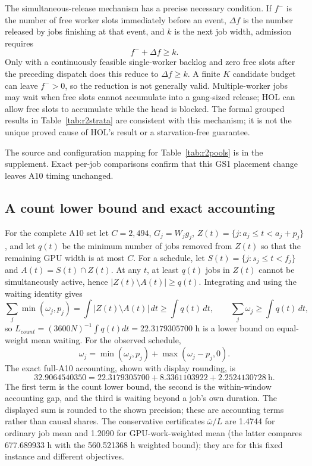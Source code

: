 The simultaneous-release mechanism has a precise necessary condition. If $f^-$ is the number of free worker slots immediately before an event, $\Delta f$ is the number released by jobs finishing at that event, and $k$ is the next job width, admission requires
\begin{equation}
 f^-+\Delta f\ge k.
\end{equation}
Only with a continuously feasible single-worker backlog and zero free slots after the preceding dispatch does this reduce to $\Delta f\ge k$. A finite $K$ candidate budget can leave $f^->0$, so the reduction is not generally valid. Multiple-worker jobs may wait when free slots cannot accumulate into a gang-sized release; HOL can allow free slots to accumulate while the head is blocked. The formal grouped results in Table~\ref{tab:r2strata} are consistent with this mechanism; it is not the unique proved cause of HOL's result or a starvation-free guarantee.



The source and configuration mapping for Table~\ref{tab:r2pools} is in the supplement. Exact per-job comparisons confirm that this GS1 placement change leaves A10 timing unchanged.

\subsection{A count lower bound and exact accounting}
For the complete A10 set let $C=2,494$, $G_j=W_jg_j$, $Z(t)=\{j:a_j\le t<a_j+p_j\}$, and let $q(t)$ be the minimum number of jobs removed from $Z(t)$ so that the remaining GPU width is at most $C$. For a schedule, let $S(t)=\{j:s_j\le t<f_j\}$ and $A(t)=S(t)\cap Z(t)$. At any $t$, at least $q(t)$ jobs in $Z(t)$ cannot be simultaneously active, hence $|Z(t)\setminus A(t)|\ge q(t)$. Integrating and using the waiting identity gives
\begin{equation}
\sum_j\min(\omega_j,p_j)=\int |Z(t)\setminus A(t)|\,dt\ge\int q(t)\,dt,
\qquad \sum_j\omega_j\ge\int q(t)\,dt,
\end{equation}
so $L_{count}=(3600N)^{-1}\int q(t)dt=22.3179305700$ h is a lower bound on equal-weight mean waiting. For the observed schedule,
\begin{equation}
\omega_j=\min(\omega_j,p_j)+\max(\omega_j-p_j,0).
\end{equation}
The exact full-A10 accounting, shown with display rounding, is
\begin{equation}
32.9064540350 = 22.3179305700 + 8.3361103922 + 2.2524130728\ \mathrm{h}.
\end{equation}
The first term is the count lower bound, the second is the within-window accounting gap, and the third is waiting beyond a job's own duration. The displayed sum is rounded to the shown precision; these are accounting terms rather than causal shares. The conservative certificates $\bar\omega/L$ are 1.4744 for ordinary job mean and 1.2090 for GPU-work-weighted mean (the latter compares 677.689933 h with the 560.521368 h weighted bound); they are for this fixed instance and different objectives.

